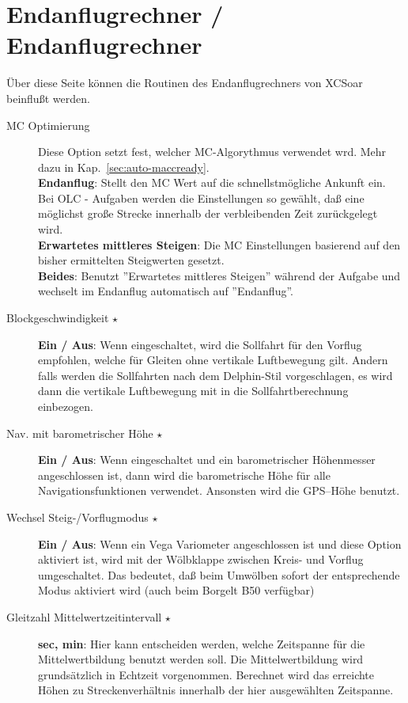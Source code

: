 \section{Endanflugrechner / Endanflugrechner}\label{sec:final-glide}
Über diese Seite können die Routinen des Endanflugrechners von \textsf{XCSoar}  beinflußt werden.

\begin{description}
\item[MC Optimierung]  Diese Option setzt fest, welcher MC-Algorythmus verwendet wrd.
Mehr dazu in Kap.~\ref{sec:auto-maccready}. \\
   {\bf Endanflug}: Stellt den MC Wert auf die schnellstmögliche Ankunft ein.
   Bei OLC - Aufgaben werden die Einstellungen  so gewählt, daß  eine möglichst große Strecke innerhalb der verbleibenden Zeit zurückgelegt wird.\\
   {\bf Erwartetes mittleres Steigen}: Die MC Einstellungen basierend auf den bisher ermittelten Steigwerten gesetzt.\\
   {\bf Beides}: Benutzt ''Erwartetes mittleres Steigen'' während der Aufgabe und wechselt im Endanflug automatisch auf  ''Endanflug''.
\item[Blockgeschwindigkeit $\star$] {\bf Ein / Aus}: Wenn eingeschaltet, wird die Sollfahrt für den Vorflug empfohlen, welche für Gleiten ohne vertikale Luftbewegung gilt.
Andern falls werden die Sollfahrten nach dem Delphin-Stil vorgeschlagen, es wird dann die vertikale Luftbewegung mit in die Sollfahrtberechnung
einbezogen.
\item[Nav. mit barometrischer Höhe $\star$] {\bf Ein / Aus}: Wenn eingeschaltet und ein barometrischer Höhenmesser angeschlossen ist, dann wird die barometrische Höhe für alle Navigationsfunktionen verwendet. Ansonsten wird die GPS--Höhe benutzt.
\item[Wechsel Steig-/Vorflugmodus $\star$] {\bf Ein / Aus}: Wenn ein Vega Variometer angeschlossen ist und diese Option aktiviert ist, wird mit der Wölbklappe zwischen Kreis- und Vorflug umgeschaltet.
Das bedeutet, daß  beim Umwölben sofort der entsprechende Modus aktiviert wird (auch beim Borgelt B50 verfügbar)
\item[Gleitzahl Mittelwertzeitintervall $\star$] {\bf sec, min}: Hier kann entscheiden werden, welche Zeitspanne für die Mittelwertbildung benutzt werden soll.
Die Mittelwertbildung wird grundsätzlich in Echtzeit vorgenommen. Berechnet wird das erreichte Höhen zu Streckenverhältnis
innerhalb der hier ausgewählten Zeitspanne.


\end{description}
